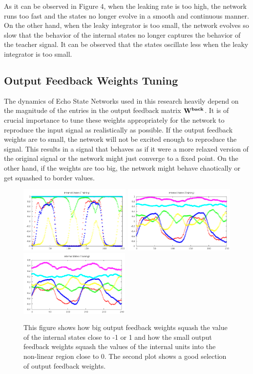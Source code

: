 \documentclass[letterpaper,9pt]{article}
\begin{document}
As it can be observed in Figure 4, when the leaking rate is too high, the network runs too fast and the states no longer evolve in a smooth and continuous manner. On the other hand, when the leaky integrator is too small, the network evolves so slow that the behavior of the internal states no longer captures the behavior of the teacher signal. It can be observed that the states oscillate less when the leaky integrator is too small. 

\subsection{Output Feedback Weights Tuning}

The dynamics of Echo State Networks used in this research heavily depend on the magnitude of the entries in the output feedback matrix ${\bf W^{back}}$. It is of crucial importance to tune these weights appropriately for the network to reproduce the input signal as realistically as possible. If the output feedback weights are to small, the network will not be excited enough to reproduce the signal. This results in a signal that behaves as if it were a more relaxed version of the original signal or the network might just converge to a fixed point. On the other hand, if the weights are too big, the network might behave chaotically or get squashed to border values.

\begin{figure}[h!]
  \centering
  \includegraphics[height=125px]{Extra/ofbw_big.png}
  \includegraphics[height=125px]{Extra/ofbw_ok.png}
  \includegraphics[height=125px]{Extra/ofbw_small.png}
    \caption[Output Feedback Weights Comparison]{This figure shows how big output feedback weights squash the value of the internal states close to -1 or 1 and how the small output feedback weights squash the values of the internal units into the non-linear region close to 0. The second plot shows a good selection of output feedback weights.}
\end{figure}
\end{document}
